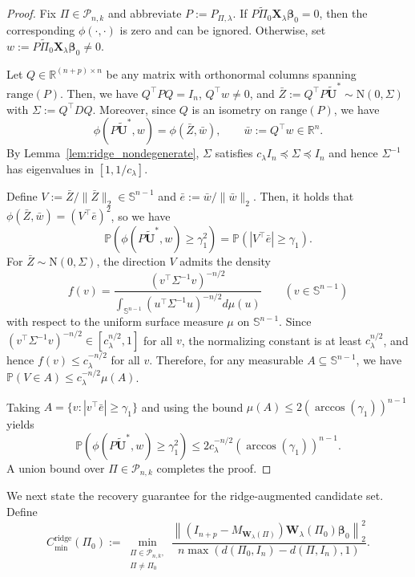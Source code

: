 \documentclass[11pt, reqno]{amsart}
\newcommand{\R}{\mathbb{R}}
\newcommand{\bP}{\mathbb{P}}
\renewcommand{\tilde}{\widetilde}
\renewcommand{\le}{\leqslant}
\renewcommand{\ge}{\geqslant}
\newcommand{\mP}{\mathcal{P}}
\newcommand{\1}{\mbox{1}\hspace{-0.25em}\mbox{l}}
\newcommand{\Normal}{\mathrm{N}}
\theoremstyle{definition}\newtheorem{problem}{Problem}[section]
\theoremstyle{definition}\newtheorem{definition}[problem]{Definition}
\theoremstyle{remark}\newtheorem{assumption}{Assumption}
\theoremstyle{remark}\newtheorem{remark}[problem]{Remark}
\theoremstyle{definition}\newtheorem{example}[problem]{Example}
\theoremstyle{plain}\newtheorem{theorem}[problem]{Theorem}
\theoremstyle{plain}\newtheorem{question}[problem]{Question}
\theoremstyle{plain}\newtheorem{lemma}[problem]{Lemma}
\theoremstyle{plain}\newtheorem{proposition}[problem]{Proposition}
\theoremstyle{plain}\newtheorem{corollary}[problem]{Corollary}
\theoremstyle{plain}\newtheorem{conjecture}[problem]{Conjecture}
\begin{document}
\begin{proof}
Fix $\Pi\in\mP_{n,k}$ and abbreviate $P:=P_{\Pi,\lambda}$.
If $P\tilde\Pi_0\bm X_\lambda \bm\beta_0=0$, then the corresponding $\phi(\cdot,\cdot)$ is zero and can be ignored.
Otherwise, set $w:=P\tilde\Pi_0\bm X_\lambda\bm\beta_0\neq 0$.

Let $Q\in\R^{(n+p)\times n}$ be any matrix with orthonormal columns spanning $\mathrm{range}(P)$.
Then, we have $Q^\top P Q=I_n$, $Q^\top w\neq 0$, and $\bar Z:=Q^\top P\tilde{\bm U}^*\sim\Normal(0,\Sigma)$ with
$\Sigma:=Q^\top D Q$.
Moreover, since $Q$ is an isometry on $\mathrm{range}(P)$, we have
\[
\phi(P\tilde{\bm U}^*,w)=\phi(\bar Z,\bar w),\qquad \bar w:=Q^\top w\in\R^{n}.
\]
By Lemma~\ref{lem:ridge_nondegenerate}, $\Sigma$ satisfies $c_\lambda I_n\preceq \Sigma\preceq I_n$ and hence
$\Sigma^{-1}$ has eigenvalues in $[1,1/c_\lambda]$.

Define $V:=\bar Z/\|\bar Z\|_2\in\mathbb{S}^{n-1}$ and $\bar e:=\bar w/\|\bar w\|_2$.
Then, it holds that $\phi(\bar Z,\bar w)=(V^\top \bar e)^2$, so we have
\[
\bP\left(\phi(P\tilde{\bm U}^*,w)\ge \gamma_1^2\right)=\bP\left(|V^\top \bar e|\ge \gamma_1\right).
\]
For $\bar Z\sim\Normal(0,\Sigma)$, the direction $V$ admits the density
\[
f(v)=\frac{(v^\top\Sigma^{-1}v)^{-n/2}}{\int_{\mathbb{S}^{n-1}}(u^\top\Sigma^{-1}u)^{-n/2}d\mu(u)}
\qquad (v\in\mathbb{S}^{n-1})
\]
with respect to the uniform surface measure $\mu$ on $\mathbb{S}^{n-1}$.
Since $(v^\top\Sigma^{-1}v)^{-n/2}\in[c_\lambda^{n/2},1]$ for all $v$, the normalizing constant is at least $c_\lambda^{n/2}$,
and hence $f(v)\le c_\lambda^{-n/2}$ for all $v$. Therefore, for any measurable $A\subseteq\mathbb{S}^{n-1}$, we have
$\bP(V\in A)\le c_\lambda^{-n/2}\mu(A)$.

Taking $A=\{v:|v^\top \bar e|\ge \gamma_1\}$ and using the bound
$\mu(A)\le 2(\arccos(\gamma_1))^{n-1}$ yields
\[
\bP\left(\phi(P\tilde{\bm U}^*,w)\ge \gamma_1^2\right)
\le 2c_\lambda^{-n/2}\left(\arccos(\gamma_1)\right)^{n-1}.
\]
A union bound over $\Pi\in\mP_{n,k}$ completes the proof.
\end{proof}

We next state the recovery guarantee for the ridge-augmented candidate set.
Define 
\begin{equation}\label{eq:c-min-ridge}
C_{\min}^{\mathrm{ridge}}(\Pi_0)
:=
\min_{\substack{\Pi \in \mP_{n, k},\\ \Pi \neq \Pi_0}}
\frac{\left\|(I_{n+p}-M_{\bm W_\lambda(\Pi)})\bm W_\lambda(\Pi_0)\bm\beta_0\right\|_2^2}
{n \max (d(\Pi_0, I_n) - d(\Pi, I_n), 1)}.
\end{equation}
\end{document}
